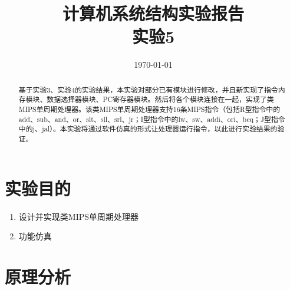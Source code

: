 \documentclass[UTF8]{ctexart}
\title{计算机系统结构实验报告\\实验5}
\date{\today}
\begin{document}
\maketitle
\thispagestyle{empty}
\begin{abstract}
    基于实验3、实验4的实验结果，本实验对部分已有模块进行修改，并且新实现了指令内存模块、数据选择器模块、PC寄存器模块。然后将各个模块连接在一起，实现了类MIPS单周期处理器。该类MIPS单周期处理器支持16条MIPS指令（包括R型指令中的add、sub、and、or、slt、sll、srl、jr；I型指令中的lw、sw、addi、ori、beq；J型指令中的j、jal）。本实验将通过软件仿真的形式让处理器运行指令，以此进行实验结果的验证。
\end{abstract}  
\tableofcontents
\clearpage

\section{实验目的}
\begin{enumerate}
    \item 设计并实现类MIPS单周期处理器
    \item 功能仿真
\end{enumerate}
\section{原理分析}
\end{document}
